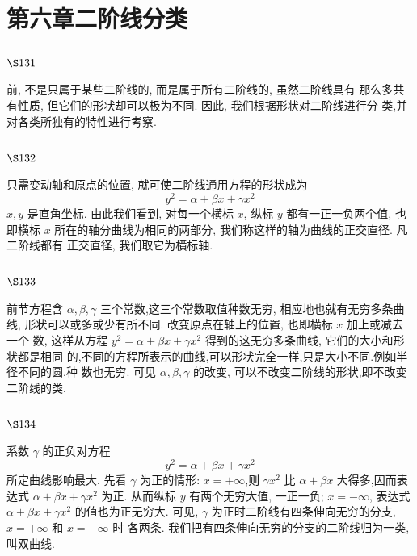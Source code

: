 \chapter{第六章二阶线分类}

\section{$\S 131$}

前, 不是只属于某些二阶线的, 而是属于所有二阶线的, 虽然二阶线具有 那么多共有性质, 但它们的形状却可以极为不同. 因此, 我们根据形状对二阶线进行分 类,并对各类所独有的特性进行考察.

\section{$\S 132$}

只需变动轴和原点的位置, 就可使二阶线通用方程的形状成为
\[
y^{2}=\alpha+\beta x+\gamma x^{2}
\]
$x, y$ 是直角坐标. 由此我们看到, 对每一个横标 $x$, 纵标 $y$ 都有一正一负两个值, 也即横标 $x$ 所在的轴分曲线为相同的两部分, 我们称这样的轴为曲线的正交直径. 凡二阶线都有 正交直径, 我们取它为横标轴.

\section{$\S 133$}

前节方程含 $\alpha, \beta, \gamma$ 三个常数,这三个常数取值种数无穷, 相应地也就有无穷多条曲 线, 形状可以或多或少有所不同. 改变原点在轴上的位置, 也即横标 $x$ 加上或减去一个 数, 这样从方程 $y^{2}=\alpha+\beta x+\gamma x^{2}$ 得到的这无穷多条曲线, 它们的大小和形状都是相同 的,不同的方程所表示的曲线,可以形状完全一样,只是大小不同.例如半径不同的圆,种 数也无穷. 可见 $\alpha, \beta, \gamma$ 的改变, 可以不改变二阶线的形状,即不改变二阶线的类.

\section{$\S 134$}

系数 $\gamma$ 的正负对方程
\[
y^{2}=\alpha+\beta x+\gamma x^{2}
\]
所定曲线影响最大. 先看 $\gamma$ 为正的情形: $x=+\infty$,则 $\gamma x^{2}$ 比 $\alpha+\beta x$ 大得多,因而表达式 $\alpha+\beta x+\gamma x^{2}$ 为正. 从而纵标 $y$ 有两个无穷大值, 一正一负; $x=-\infty$, 表达式 $\alpha+\beta x+\gamma x^{2}$ 的值也为正无穷大. 可见, $\gamma$ 为正时二阶线有四条伸向无穷的分支, $x=+\infty$ 和 $x=-\infty$ 时 各两条. 我们把有四条伸向无穷的分支的二阶线归为一类, 叫双曲线. 

